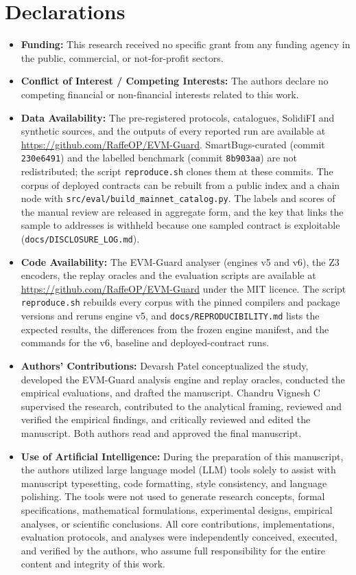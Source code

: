 \documentclass[pdflatex,sn-mathphys]{sn-jnl}
\theoremstyle{thmstyletwo}
\theoremstyle{thmstyletwo}
\begin{document}
\section*{Declarations}
\begin{itemize}
    \item \textbf{Funding:} This research received no specific grant from any funding agency in the public, commercial, or not-for-profit sectors.
    \item \textbf{Conflict of Interest / Competing Interests:} The authors declare no competing financial or non-financial interests related to this work.
    \item \textbf{Data Availability:} The pre-registered protocols, catalogues, SolidiFI and synthetic sources, and the outputs of every reported run are available at \url{https://github.com/RaffeOP/EVM-Guard}. SmartBugs-curated (commit \texttt{230e6491}) and the labelled benchmark (commit \texttt{8b903aa}) are not redistributed; the script \texttt{reproduce.sh} clones them at these commits. The corpus of deployed contracts can be rebuilt from a public index and a chain node with \texttt{src/eval/build\_mainnet\_catalog.py}. The labels and scores of the manual review are released in aggregate form, and the key that links the sample to addresses is withheld because one sampled contract is exploitable (\texttt{docs/DISCLOSURE\_LOG.md}).
    \item \textbf{Code Availability:} The EVM-Guard analyser (engines v5 and v6), the Z3 encoders, the replay oracles and the evaluation scripts are available at \url{https://github.com/RaffeOP/EVM-Guard} under the MIT licence. The script \texttt{reproduce.sh} rebuilds every corpus with the pinned compilers and package versions and reruns engine v5, and \texttt{docs/REPRODUCIBILITY.md} lists the expected results, the differences from the frozen engine manifest, and the commands for the v6, baseline and deployed-contract runs.
    \item \textbf{Authors' Contributions:} Devarsh Patel conceptualized the study, developed the EVM-Guard analysis engine and replay oracles, conducted the empirical evaluations, and drafted the manuscript. Chandru Vignesh C supervised the research, contributed to the analytical framing, reviewed and verified the empirical findings, and critically reviewed and edited the manuscript. Both authors read and approved the final manuscript.
    \item \textbf{Use of Artificial Intelligence:} During the preparation of this manuscript, the authors utilized large language model (LLM) tools solely to assist with manuscript typesetting, code formatting, style consistency, and language polishing. The tools were not used to generate research concepts, formal specifications, mathematical formulations, experimental designs, empirical analyses, or scientific conclusions. All core contributions, implementations, evaluation protocols, and analyses were independently conceived, executed, and verified by the authors, who assume full responsibility for the entire content and integrity of this work.
\end{itemize}


\end{document}
